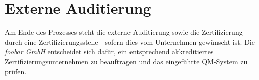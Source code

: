 \section{Externe Auditierung}
Am Ende des Prozesses steht die externe Auditierung sowie die Zertifizierung
durch eine Zertifizierungsstelle - sofern dies vom Unternehmen gewünscht ist.
Die \emph{foobar GmbH} entscheidet sich dafür, ein entsprechend
akkreditiertes Zertifizierungsunternehmen zu beauftragen und das eingeführte
QM-System zu prüfen.
